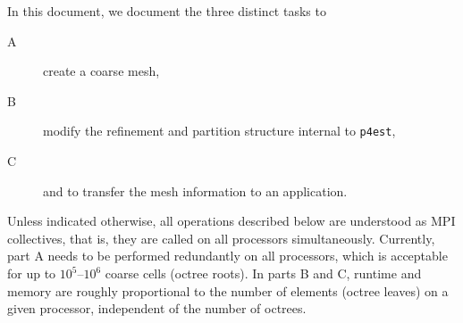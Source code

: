 \documentclass[letterpaper,11pt]{article}
\newcommand{\pforest}{\texttt{p4est}\xspace}
\begin{document}
In this document, we document the three distinct tasks to
\begin{description}
\item[A] create a coarse mesh,
\item[B] modify the refinement and partition structure internal to \pforest,
\item[C] and to transfer the mesh information to an application.
\end{description}
Unless indicated otherwise, all operations described below are understood as
MPI collectives, that is, they are called on all processors simultaneously.
Currently, part A needs to be performed redundantly on all processors, which is
acceptable for up to $10^5$--$10^6$ coarse cells (octree roots).  In parts B
and C, runtime and memory are roughly proportional to the number of elements
(octree leaves) on a given processor, independent of the number of octrees.



\end{document}
